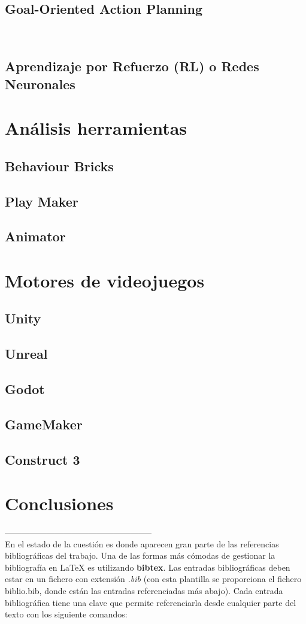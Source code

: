 \subsection{Goal-Oriented Action Planning}

\\ 
\subsection{Aprendizaje por Refuerzo (RL) o Redes Neuronales}
\section{Análisis herramientas}
\subsection{Behaviour Bricks}
\subsection{Play Maker}
\subsection{Animator}
\section{Motores de videojuegos}
\subsection{Unity}
\subsection{Unreal}
\subsection{Godot}
\subsection{GameMaker}
\subsection{Construct 3}
\section{Conclusiones}
-----------------------------------------------------\\
En el estado de la cuestión es donde aparecen gran parte de las referencias bibliográficas del trabajo. Una de las formas más cómodas de gestionar la bibliografía en {\LaTeX} es utilizando \textbf{bibtex}. Las entradas bibliográficas deben estar en un fichero con extensión \textit{.bib} (con esta plantilla se proporciona el fichero biblio.bib, donde están las entradas referenciadas más abajo). Cada entrada bibliográfica tiene una clave que permite referenciarla desde cualquier parte del texto con los siguiente comandos:

